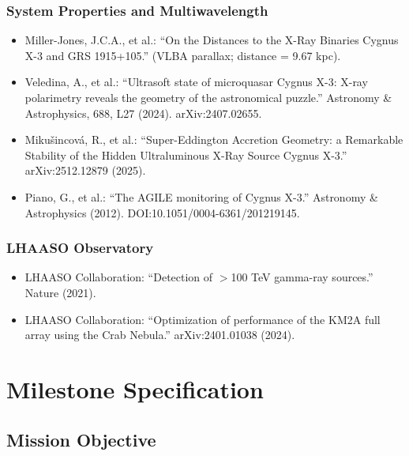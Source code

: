 \documentclass[11pt,letterpaper]{article}
\newcommand{\stageheader}[2]{%
  \noindent\colorbox{#2}{\makebox[\textwidth][l]{%
    \textcolor{white}{\bfseries\sffamily\hspace{6pt}#1\hspace{6pt}}}}%
  \vspace{0.5em}\par%
}
\begin{document}
\subsubsection{System Properties and Multiwavelength}
\begin{itemize}[noitemsep]
  \item Miller-Jones, J.C.A., et al.: ``On the Distances to the X-Ray Binaries Cygnus X-3 and GRS 1915+105.'' (VLBA parallax; distance = 9.67 kpc).
  \item Veledina, A., et al.: ``Ultrasoft state of microquasar Cygnus X-3: X-ray polarimetry reveals the geometry of the astronomical puzzle.'' Astronomy \& Astrophysics, 688, L27 (2024). arXiv:2407.02655.
  \item Mikušincová, R., et al.: ``Super-Eddington Accretion Geometry: a Remarkable Stability of the Hidden Ultraluminous X-Ray Source Cygnus X-3.'' arXiv:2512.12879 (2025).
  \item Piano, G., et al.: ``The AGILE monitoring of Cygnus X-3.'' Astronomy \& Astrophysics (2012). DOI:10.1051/0004-6361/201219145.
\end{itemize}

\subsubsection{LHAASO Observatory}
\begin{itemize}[noitemsep]
  \item LHAASO Collaboration: ``Detection of $>$100 TeV gamma-ray sources.'' Nature (2021).
  \item LHAASO Collaboration: ``Optimization of performance of the KM2A full array using the Crab Nebula.'' arXiv:2401.01038 (2024).
\end{itemize}

\newpage
\stageheader{STAGE 3 --- MISSION PACKAGE}{tertiary}

\section{Milestone Specification}

\subsection{Mission Objective}
\end{document}
